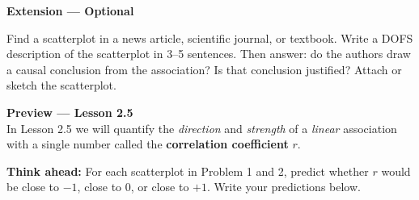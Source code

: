 \documentclass[10pt]{article}
\begin{document}
\begin{extensionbox}
\small\textbf{Extension --- Optional}

Find a scatterplot in a news article, scientific journal, or textbook. Write a DOFS description
of the scatterplot in 3--5 sentences. Then answer: do the authors draw a causal conclusion from
the association? Is that conclusion justified? Attach or sketch the scatterplot.
\end{extensionbox}

\vspace{0.16in}

\begin{tcolorbox}[colback=greenbg, colframe=greenacc, boxrule=0.8pt, arc=2mm,
    left=4mm, right=4mm, top=3mm, bottom=3mm]
\small\textbf{Preview --- Lesson 2.5}\\[4pt]
In Lesson 2.5 we will quantify the \emph{direction} and \emph{strength} of a \textit{linear}
association with a single number called the \textbf{correlation coefficient} $r$.

\vspace{4pt}
\textbf{Think ahead:} For each scatterplot in Problem 1 and 2, predict whether $r$ would be
close to $-1$, close to $0$, or close to $+1$. Write your predictions below.\\[6pt]
\writeline\\[2pt]\writeline
\end{tcolorbox}
\end{document}
